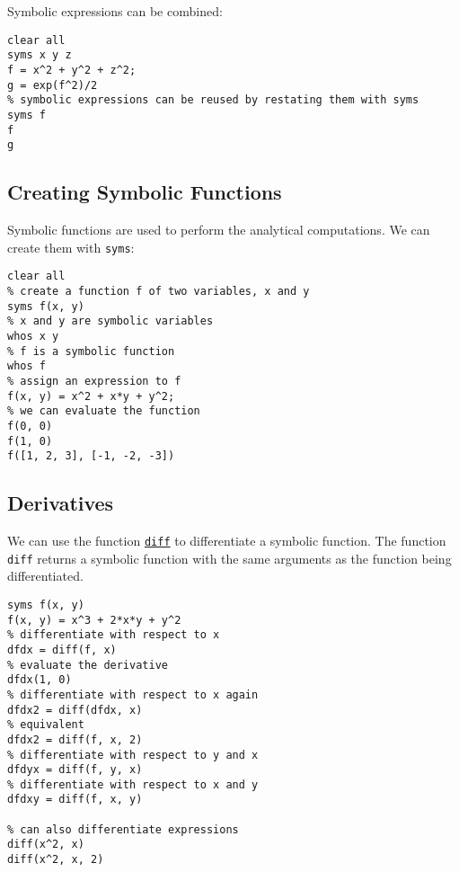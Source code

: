 \documentclass[12pt, a4paper]{article}
\begin{document}
Symbolic expressions can be combined:
\lstset{language=matlab,label= ,caption= ,captionpos=b,firstnumber=1,numbers=left,style=Matlab-editor}
\begin{lstlisting}
clear all
syms x y z
f = x^2 + y^2 + z^2;
g = exp(f^2)/2
% symbolic expressions can be reused by restating them with syms
syms f
f
g
\end{lstlisting}
\subsection{Creating Symbolic Functions}
\label{sec:org0e15d3c}
Symbolic functions are used to perform the analytical computations.
We can create them with \texttt{syms}:
\lstset{language=matlab,label= ,caption= ,captionpos=b,firstnumber=1,numbers=left,style=Matlab-editor}
\begin{lstlisting}
clear all
% create a function f of two variables, x and y
syms f(x, y)
% x and y are symbolic variables
whos x y
% f is a symbolic function
whos f
% assign an expression to f
f(x, y) = x^2 + x*y + y^2;
% we can evaluate the function
f(0, 0)
f(1, 0)
f([1, 2, 3], [-1, -2, -3])
\end{lstlisting}
\subsection{Derivatives}
\label{sec:orgef85bde}
We can use the function \href{https://www.mathworks.com/help/symbolic/diff.html?s\_tid=doc\_ta}{\texttt{diff}} to differentiate a symbolic function.
The function \texttt{diff} returns a symbolic function with the same arguments as the function being differentiated.
\lstset{language=matlab,label= ,caption= ,captionpos=b,firstnumber=1,numbers=left,style=Matlab-editor}
\begin{lstlisting}
syms f(x, y)
f(x, y) = x^3 + 2*x*y + y^2
% differentiate with respect to x
dfdx = diff(f, x)
% evaluate the derivative
dfdx(1, 0)
% differentiate with respect to x again
dfdx2 = diff(dfdx, x)
% equivalent
dfdx2 = diff(f, x, 2)
% differentiate with respect to y and x
dfdyx = diff(f, y, x)
% differentiate with respect to x and y
dfdxy = diff(f, x, y)

% can also differentiate expressions
diff(x^2, x)
diff(x^2, x, 2)
\end{lstlisting}
\end{document}
